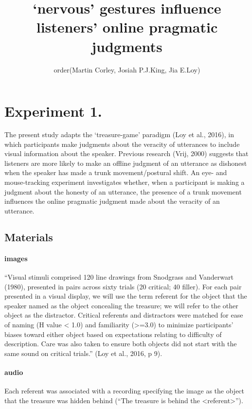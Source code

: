 \documentclass[a4paper,man,natbib]{apa6}
\title{`nervous' gestures influence listeners' online pragmatic judgments}
\author{order(Martin Corley, Josiah P.\@ J.\@ King, Jia E.\@ Loy)}
\affiliation{Psychology, PPLS, University of Edinburgh}
\begin{document}
\maketitle
\noindent









\section{Experiment 1.}
The present study adapts the ‘treasure-game’ paradigm (Loy et al., 2016), in which participants make judgments about the veracity of utterances to include visual information about the speaker. 
Previous research (Vrij, 2000) suggests that listeners are more likely to make an offline judgment of an utterance as dishonest when the speaker has made a trunk movement/postural shift. 
An eye- and mouse-tracking experiment investigates whether, when a participant is making a judgment about the honesty of an utterance, the presence of a trunk movement influences the online pragmatic judgment made about the veracity of an utterance.

\subsection{Materials}
\paragraph{images}
“Visual stimuli comprised 120 line drawings from Snodgrass and Vanderwart (1980), presented in pairs across sixty trials (20 critical; 40 filler). 
For each pair presented in a visual display, we will use the term referent for the object that the speaker named as the object concealing the treasure; we will refer to the other object as the distractor. 
Critical referents and distractors were matched for ease of naming (H value < 1.0) and familiarity (>=3.0) to minimize participants’ biases toward either object based on expectations relating to difficulty of description. 
Care was also taken to ensure both objects did not start with the same sound on critical trials.” (Loy et al., 2016, p 9).
\paragraph{audio}
Each referent was associated with a recording specifying the image as the object that the treasure was hidden behind (“The treasure is behind the <referent>”).
\end{document}
